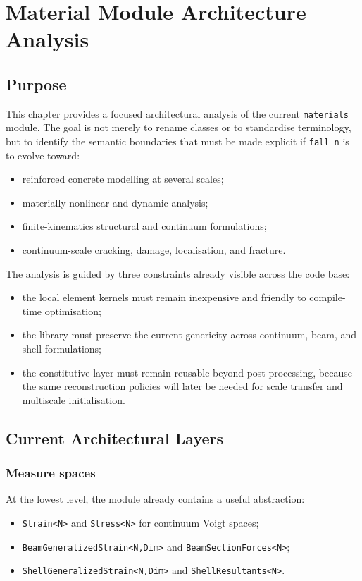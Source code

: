 \chapter{Material Module Architecture Analysis}
\label{ch:material-module-analysis}

\section{Purpose}

This chapter provides a focused architectural analysis of the current
\texttt{materials} module.  The goal is not merely to rename classes or to
standardise terminology, but to identify the semantic boundaries that must be
made explicit if \texttt{fall\_n} is to evolve toward:
\begin{itemize}
  \item reinforced concrete modelling at several scales;
  \item materially nonlinear and dynamic analysis;
  \item finite-kinematics structural and continuum formulations;
  \item continuum-scale cracking, damage, localisation, and fracture.
\end{itemize}

The analysis is guided by three constraints already visible across the code
base:
\begin{itemize}
  \item the local element kernels must remain inexpensive and friendly to
        compile-time optimisation;
  \item the library must preserve the current genericity across continuum,
        beam, and shell formulations;
  \item the constitutive layer must remain reusable beyond post-processing,
        because the same reconstruction policies will later be needed for
        scale transfer and multiscale initialisation.
\end{itemize}

\section{Current Architectural Layers}

\subsection{Measure spaces}

At the lowest level, the module already contains a useful abstraction:
\begin{itemize}
  \item \texttt{Strain<N>} and \texttt{Stress<N>} for continuum Voigt spaces;
  \item \texttt{BeamGeneralizedStrain<N,Dim>} and \texttt{BeamSectionForces<N>};
  \item \texttt{ShellGeneralizedStrain<N,Dim>} and \texttt{ShellResultants<N>}.
\end{itemize}


